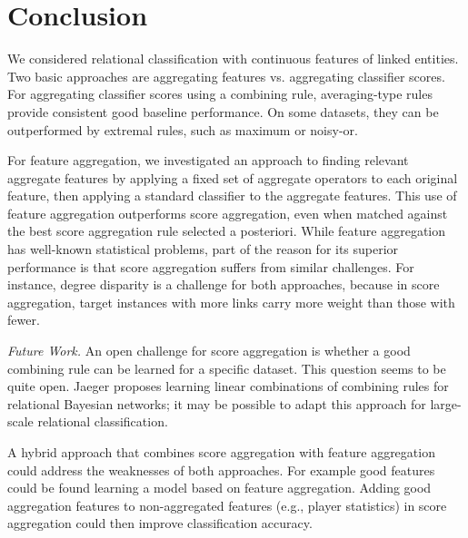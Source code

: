 \documentclass[conference]{IEEEtran}
\begin{document}



\section{Conclusion}


We considered relational classification with continuous features of linked entities. Two basic approaches are aggregating features vs. aggregating classifier scores. For aggregating classifier scores using a combining rule, averaging-type rules provide consistent good baseline performance. On some datasets, they can be outperformed by extremal rules, such as maximum or noisy-or.

For feature aggregation, we investigated an approach to finding relevant aggregate features by applying a fixed set of aggregate operators to each original feature, then applying a standard classifier to the aggregate features. This use of feature aggregation outperforms score aggregation, even when matched against the best score aggregation rule selected a posteriori. While feature aggregation has well-known statistical problems, part of the reason for its superior performance is that score aggregation suffers from similar challenges. For instance, degree disparity is a challenge for both approaches, because in score aggregation, target instances with more links carry more weight than those with fewer.

{\em Future Work.} An open challenge for score aggregation is whether a good combining rule can be learned for a specific dataset. This question seems to be quite open. Jaeger \cite{Jaeger2007} proposes learning linear combinations of combining rules for relational Bayesian networks; it may be possible to adapt this approach for large-scale relational classification.

A hybrid approach that combines score aggregation with feature aggregation could address the weaknesses of both approaches.
For example good features could be found learning a model based on feature aggregation. Adding  good aggregation features to non-aggregated features (e.g., player statistics) in score aggregation could then improve classification accuracy.
\end{document}
